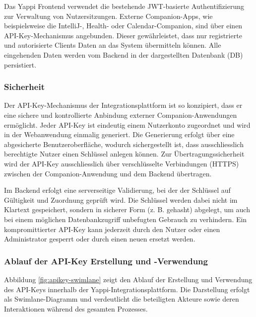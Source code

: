 \documentclass[12pt,a4paper]{report}
\begin{document}
Das Yappi Frontend verwendet die bestehende JWT-basierte Authentifizierung zur Verwaltung von Nutzersitzungen. Externe
Companion-Apps, wie beispielsweise die IntelliJ-, Health- oder Calendar-Companion, sind über einen API-Key-Mechanismus angebunden.
Dieser gewährleistet, dass nur registrierte und autorisierte Clients Daten an das System übermitteln können. Alle eingehenden
Daten werden vom Backend in der dargestellten Datenbank (DB) persistiert.

\subsubsection{Sicherheit}

Der API-Key-Mechanismus der Integrationsplattform ist so konzipiert, dass er eine sichere und kontrollierte Anbindung externer
Companion-Anwendungen ermöglicht. Jeder API-Key ist eindeutig einem Nutzerkonto zugeordnet und wird in der Webanwendung einmalig
generiert. Die Generierung erfolgt über eine abgesicherte Benutzeroberfläche, wodurch sichergestellt ist, dass ausschliesslich
berechtigte Nutzer einen Schlüssel anlegen können. Zur Übertragungssicherheit wird der API-Key ausschliesslich über verschlüsselte
Verbindungen (HTTPS) zwischen der Companion-Anwendung und dem Backend übertragen.

Im Backend erfolgt eine serverseitige Validierung, bei der der Schlüssel auf Gültigkeit und Zuordnung geprüft wird. Die Schlüssel
werden dabei nicht im Klartext gespeichert, sondern in sicherer Form (z. B. gehasht) abgelegt, um auch bei einem möglichen
Datenbankzugriff unbefugten Gebrauch zu verhindern. Ein kompromittierter API-Key kann jederzeit durch den Nutzer oder einen
Administrator gesperrt oder durch einen neuen ersetzt werden.

\subsubsection{Ablauf der API-Key Erstellung und -Verwendung}

Abbildung \ref{fig:apikey-swimlane} zeigt den Ablauf der Erstellung und Verwendung des API-Keys innerhalb der
Yappi-Integrationsplattform. Die Darstellung erfolgt als Swimlane-Diagramm und verdeutlicht die beteiligten Akteure sowie deren
Interaktionen während des gesamten Prozesses.
\end{document}
